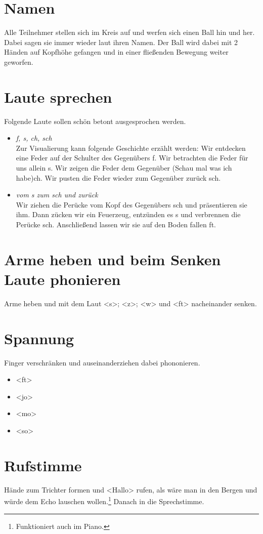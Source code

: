 \documentclass[ngerman, a4paper, twoside]{scrbook}%
\begin{document}
	\section{Namen}
	 Alle Teilnehmer stellen sich im Kreis auf und werfen sich einen Ball hin und her. Dabei sagen sie immer wieder laut ihren Namen. Der Ball wird dabei mit 2 Händen auf Kopfhöhe gefangen und in einer fließenden Bewegung weiter geworfen.
	 \section{Laute sprechen}
	 Folgende Laute sollen schön betont ausgesprochen werden.
	  \begin{itemize}
	  	\item \emph{f, s, ch, sch}\\
	  	Zur Visualierung kann folgende Geschichte erzählt werden: Wir entdecken eine Feder auf der Schulter des Gegenübers {f}. Wir betrachten die Feder für uns allein {s}. Wir zeigen die Feder dem Gegenüber (Schau mal was ich habe){ch}. Wir pusten die Feder wieder zum Gegenüber zurück {sch}.
	  	\item \emph{vom s zum sch und zurück}\\
	  	Wir ziehen die Perücke vom Kopf des Gegenübers {sch} und präsentieren sie ihm. Dann zücken wir ein Feuerzeug, entzünden es {s} und verbrennen die Perücke {sch}. Anschließend lassen wir sie auf den Boden fallen {ft}.
	  \end{itemize}
	  \section{Arme heben und beim Senken Laute phonieren}
	  Arme heben und mit dem Laut <s>; <z>; <w> und <ft> nacheinander senken.
	  \section{Spannung}
	  Finger verschränken und auseinanderziehen dabei phononieren.
	  \begin{itemize}
	  \item <ft>
	  \item <jo>
	  \item <mo>
	  \item <so>
	  \end{itemize}
	  \section{Rufstimme}
	  Hände zum Trichter formen und <Hallo> rufen, als wäre man in den Bergen und würde dem Echo lauschen wollen.\footnote{Funktioniert auch im Piano.} Danach in die Sprechstimme.
\end{document}
